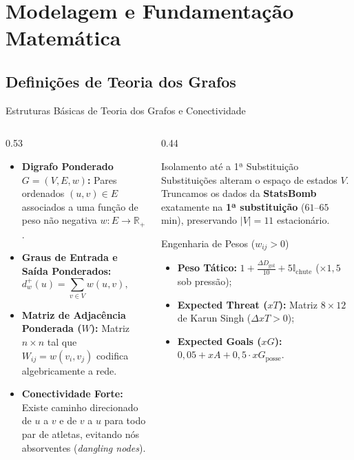\documentclass[aspectratio=1610,10pt]{beamer}
\begin{document}
\section{Modelagem e Fundamentação Matemática}
\subsection{Definições de Teoria dos Grafos}
\begin{frame}{Estruturas Básicas de Teoria dos Grafos e Conectividade}
  \footnotesize
  \begin{columns}[T,onlytextwidth]
    \begin{column}{0.53\textwidth}
      \begin{itemize}
        \setlength{\itemsep}{5pt}
        \item \textbf{Digrafo Ponderado $G = (V, E, w)$:} Pares ordenados $(u, v) \in E$ associados a uma função de peso não negativa $w: E \to \mathbb{R}_{+}$.
        \item \textbf{Graus de Entrada e Saída Ponderados:}
        \[
          d^{+}_{w}(u) = \sum_{v \in V} w(u, v), \qquad d^{-}_{w}(u) = \sum_{v \in V} w(v, u)
        \]
        \item \textbf{Matriz de Adjacência Ponderada ($W$):} Matriz $n \times n$ tal que $W_{ij} = w(v_i, v_j)$ codifica algebricamente a rede.
        \item \textbf{Conectividade Forte:} Existe caminho direcionado de $u$ a $v$ e de $v$ a $u$ para todo par de atletas, evitando nós absorventes (\textit{dangling nodes}).
      \end{itemize}
    \end{column}
    \begin{column}{0.44\textwidth}
      \begin{block}{Isolamento até a 1ª Substituição}
        Substituições alteram o espaço de estados $V$. Truncamos os dados da \textbf{StatsBomb} exatamente na \textbf{1ª substituição} ($61$--$65$ min), preservando $|V| = 11$ estacionário.
      \end{block}
      \begin{block}{Engenharia de Pesos ($w_{ij} > 0$)}
        \begin{itemize}
          \scriptsize
          \item \textbf{Peso Tático:} $1 + \frac{\Delta D_{\text{gol}}}{10} + 5\mathbb{I}_{\text{chute}}$ ($\times 1{,}5$ sob pressão);
          \item \textbf{Expected Threat ($xT$):} Matriz $8 \times 12$ de Karun Singh ($\Delta xT > 0$);
          \item \textbf{Expected Goals ($xG$):} $0{,}05 + xA + 0{,}5\cdot xG_{\text{posse}}$.
        \end{itemize}
      \end{block}
    \end{column}
  \end{columns}
\end{frame}
\end{document}
